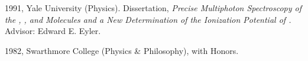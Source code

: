 \item[Ph.D.:] 1991, Yale University (Physics). Dissertation, \emph{Precise Multiphoton Spectroscopy of the , , and  Molecules and a New Determination of the Ionization Potential of .} Advisor: Edward E. Eyler.
\item[B.A.:] 1982, Swarthmore College (Physics \& Philosophy), with Honors.
